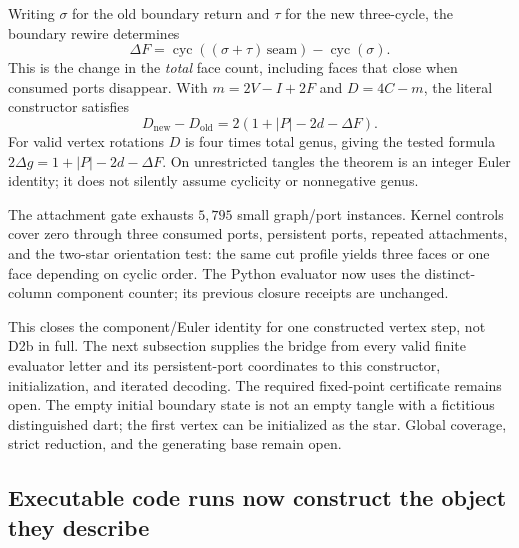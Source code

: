 Writing $\sigma$ for the old boundary return and $\tau$ for the new
three-cycle, the boundary rewire determines
\[
 \Delta F=\operatorname{cyc}((\sigma+\tau)\,\mathrm{seam})
                 -\operatorname{cyc}(\sigma).
\]
This is the change in the \emph{total} face count, including faces
that close when consumed ports disappear. With $m=2V-I+2F$ and
$D=4C-m$, the literal constructor satisfies
\[
 D_{\mathrm{new}}-D_{\mathrm{old}}
       =2(1+|P|-2d-\Delta F).
\]
For valid vertex rotations $D$ is four times total genus, giving the
tested formula $2\Delta g=1+|P|-2d-\Delta F$. On unrestricted tangles
the theorem is an integer Euler identity; it does not silently assume
cyclicity or nonnegative genus.

The attachment gate exhausts $5{,}795$ small graph/port instances.
Kernel controls cover zero through three consumed ports, persistent
ports, repeated attachments, and the two-star orientation test: the
same cut profile yields three faces or one face depending on cyclic
order. The Python evaluator now uses the distinct-column component
counter; its previous closure receipts are unchanged.

This closes the component/Euler identity for one constructed vertex
step, not D2b in full. The next subsection supplies the bridge from
every valid finite evaluator letter and its persistent-port coordinates
to this constructor, initialization, and iterated decoding. The required
fixed-point certificate remains open. The empty initial boundary state is
not an empty tangle with a fictitious distinguished dart; the first
vertex can be initialized as the star. Global coverage, strict
reduction, and the generating base remain open.

\subsection{Executable code runs now construct the object they describe}
\label{sec:executable-physical-code-runs}

